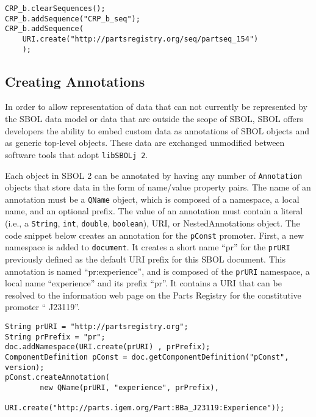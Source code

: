 \vspace{\abovedisplayskip}
\begin{minipage}{0.95\textwidth} 
\begin{lstlisting}
CRP_b.clearSequences();
CRP_b.addSequence("CRP_b_seq");
CRP_b.addSequence(
	URI.create("http://partsregistry.org/seq/partseq_154")
	);
\end{lstlisting}
\end{minipage}

\subsection*{Creating Annotations}
In order to allow representation of data that can not currently be represented
by the SBOL data model or data that are outside the scope of SBOL,
SBOL offers developers the ability to embed custom data as annotations
of SBOL objects and as generic top-level objects. These data are exchanged unmodified between
software tools that adopt {\tt libSBOLj 2}. 

Each object in SBOL 2 can be annotated by having any number of
\lstinline+Annotation+ objects that store data in the form of name/value 
property pairs. The name of an annotation must be a \lstinline+QName+
object, which is composed of a namespace, a
local name, and an optional prefix. The value of an annotation must contain a literal (i.e., a
\lstinline+String+, \lstinline+int+, \lstinline+double+,
\lstinline+boolean+), URI, or NestedAnnotations object. The code
snippet below creates an annotation for the \lstinline+pConst+ promoter. First, a new namespace is added to \lstinline+document+. It creates a short name ``pr'' for the \lstinline+prURI+
previously defined as the default URI prefix for this SBOL
document. This annotation is named ``pr:experience'', and is composed of
the \lstinline+prURI+ namespace, a local name ``experience'' and its prefix ``pr''.  It
contains a URI that can be resolved to the information web page
on the Parts Registry for the constitutive promoter `` J23119''.

\vspace{\abovedisplayskip}
\begin{minipage}{0.95\textwidth} 
\begin{lstlisting}
String prURI = "http://partsregistry.org"; 
String prPrefix = "pr";
doc.addNamespace(URI.create(prURI) , prPrefix);
ComponentDefinition pConst = doc.getComponentDefinition("pConst", version);
pConst.createAnnotation(
        new QName(prURI, "experience", prPrefix),
        URI.create("http://parts.igem.org/Part:BBa_J23119:Experience"));
\end{lstlisting}
\end{minipage}

